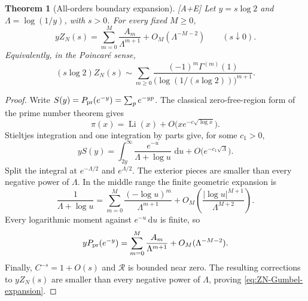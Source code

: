 \documentclass[11pt]{article}
\newtheorem{theorem}{Theorem}[section]
\theoremstyle{definition}
\theoremstyle{remark}
\newcommand{\status}[1]{\textnormal{\textcolor{accent}{\footnotesize[#1]}}}
\newcommand{\dd}{\,\mathrm d}
\begin{document}
\begin{theorem}[All-orders boundary expansion]\label{thm:ZN-Gumbel}
\status{A+E}
Let $y=s\log2$ and $\Lambda=\log(1/y)$, with $s>0$.  For every fixed $M\ge0$,
\begin{equation}\label{eq:ZN-Gumbel-expansion}
 yZ_N(s)=\sum_{m=0}^{M}\frac{A_m}{\Lambda^{m+1}}
 +O_M(\Lambda^{-M-2})\qquad(s\downarrow0).
\end{equation}
Equivalently, in the Poincar\'e sense,
\begin{equation}\label{eq:ZN-Gumbel-Poincare}
 (s\log2)Z_N(s)\sim
 \sum_{m\ge0}\frac{(-1)^m\Gamma^{(m)}(1)}
 {\bigl(\log(1/(s\log2))\bigr)^{m+1}}.
\end{equation}
\end{theorem}

\begin{proof}
Write $S(y)=P_{\rm pr}(e^{-y})=\sum_pe^{-yp}$.  The classical zero-free-region
form of the prime number theorem gives
\begin{equation}\label{eq:PNT-Li-error}
 \pi(x)=\operatorname{Li}(x)+O\bigl(xe^{-c\sqrt{\log x}}\bigr).
\end{equation}
Stieltjes integration and one integration by parts give, for some $c_1>0$,
\begin{equation}\label{eq:prime-Laplace-reduction}
 yS(y)=\int_{2y}^\infty\frac{e^{-u}}{\Lambda+\log u}\,\dd u
       +O\bigl(e^{-c_1\sqrt\Lambda}\bigr).
\end{equation}
Split the integral at $e^{-\Lambda/2}$ and $e^{\Lambda/2}$.  The exterior pieces are
smaller than every negative power of $\Lambda$.  In the middle range the finite
geometric expansion is
\[
 \frac1{\Lambda+\log u}
 =\sum_{m=0}^{M}\frac{(-\log u)^m}{\Lambda^{m+1}}
 +O_M\left(\frac{|\log u|^{M+1}}{\Lambda^{M+2}}\right).
\]
Every logarithmic moment against $e^{-u}\dd u$ is finite, so
\begin{equation}\label{eq:prime-Gumbel-expansion}
 yP_{\rm pr}(e^{-y})
 =\sum_{m=0}^{M}\frac{A_m}{\Lambda^{m+1}}+O_M(\Lambda^{-M-2}).
\end{equation}
Finally, $C^{-s}=1+O(s)$ and $\mathscr R$ is bounded near zero.  The resulting
corrections to $yZ_N(s)$ are smaller than every negative power of $\Lambda$, proving
\eqref{eq:ZN-Gumbel-expansion}.
\end{proof}
\end{document}
